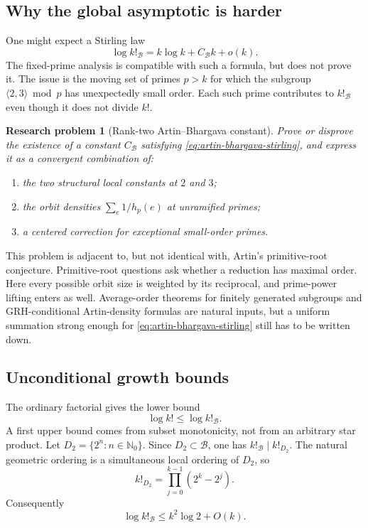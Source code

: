 \documentclass[11pt,oneside]{article}
\newtheorem{problem}[theorem]{Research problem}
\theoremstyle{definition}
\theoremstyle{remark}
\newcommand{\Nzero}{\mathbb N_0}
\newcommand{\B}{\mathcal B}
\begin{document}
\subsection{Why the global asymptotic is harder}

One might expect a Stirling law
\begin{equation}
 \log k!_{\B}=k\log k+C_{\B}k+o(k).
 \label{eq:artin-bhargava-stirling}
\end{equation}
The fixed-prime analysis is compatible with such a formula, but does not prove it.  The issue
is the moving set of primes \(p>k\) for which the subgroup
\(\langle2,3\rangle\bmod p\) has unexpectedly small order.  Each such prime contributes to
\(k!_{\B}\) even though it does not divide \(k!\).

\begin{problem}[Rank-two Artin--Bhargava constant]
\label{prob:artin-bhargava}
Prove or disprove the existence of a constant \(C_{\B}\) satisfying
\eqref{eq:artin-bhargava-stirling}, and express it as a convergent combination of:
\begin{enumerate}
\item the two structural local constants at \(2\) and \(3\);
\item the orbit densities \(\sum_e1/h_p(e)\) at unramified primes;
\item a centered correction for exceptional small-order primes.
\end{enumerate}
\end{problem}

This problem is adjacent to, but not identical with, Artin's primitive-root conjecture.
Primitive-root questions ask whether a reduction has maximal order.  Here every possible
orbit size is weighted by its reciprocal, and prime-power lifting enters as well.  Average-order
theorems for finitely generated subgroups and GRH-conditional Artin-density formulas are
natural inputs, but a uniform summation strong enough for \eqref{eq:artin-bhargava-stirling}
still has to be written down.

\subsection{Unconditional growth bounds}

The ordinary factorial gives the lower bound
\begin{equation}
  \log k!\le\log k!_{\B}.
  \label{eq:growth-lower}
\end{equation}
A first upper bound comes from subset monotonicity, not from an arbitrary star product.  Let
\(D_2=\{2^n:n\in\Nzero\}\).  Since \(D_2\subset\B\), one has
\(k!_{\B}\mid k!_{D_2}\).  The natural geometric ordering is a simultaneous local ordering
of \(D_2\), so
\[
 k!_{D_2}=\prod_{j=0}^{k-1}(2^k-2^j).
\]
Consequently
\begin{equation}
  \log k!_{\B}\le k^2\log2+O(k).
  \label{eq:quadratic-upper}
\end{equation}
\end{document}
